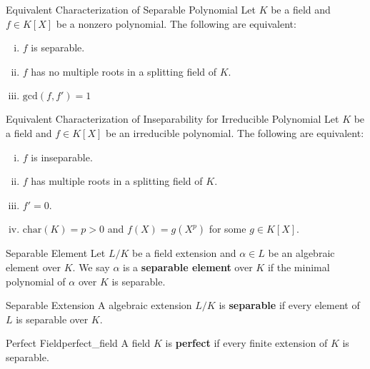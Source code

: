 \begin{proposition}{Equivalent Characterization of Separable Polynomial}{}
    Let $K$ be a field and $f\in K[X]$ be a nonzero polynomial. The following are equivalent:
    \begin{enumerate}[(i)]
        \item $f$ is separable.
        \item $f$ has no multiple roots in a splitting field of $K$.
        \item $\mathrm{gcd}(f,f')= 1$
    \end{enumerate}
\end{proposition}

\begin{proposition}{Equivalent Characterization of Inseparability for Irreducible Polynomial}{}
    Let $K$ be a field and $f\in K[X]$ be an irreducible polynomial. The following are equivalent:
    \begin{enumerate}[(i)]
        \item $f$ is inseparable.
        \item $f$ has multiple roots in a splitting field of $K$.
        \item $f'=0$.
        \item $\mathrm{char}(K)=p>0$ and $f(X)=g(X^p)$ for some $g\in K[X]$.
    \end{enumerate}
    
\end{proposition}

\begin{definition}{Separable Element}{}
    Let $L/K$ be a field extension and $\alpha\in L$ be an algebraic element over $K$. We say $\alpha$ is a \textbf{separable element} over $K$ if the minimal polynomial of $\alpha$ over $K$ is separable. 
\end{definition}

\begin{definition}{Separable Extension}{}
    A algebraic extension $L/K$ is \textbf{separable} if every element of $L$ is separable over $K$.
\end{definition}

\begin{definition}{Perfect Field}{perfect_field}
    A field $K$ is \textbf{perfect} if every finite extension of $K$ is separable.
\end{definition}

